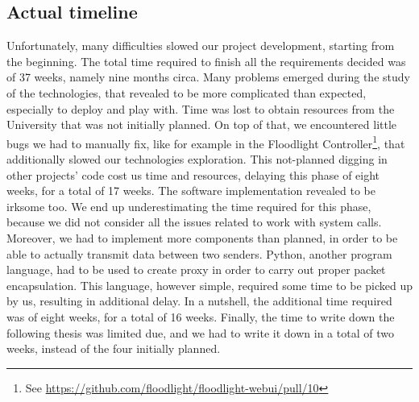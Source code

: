 \subsection{Actual timeline}
Unfortunately, many difficulties slowed our project development, starting from
the beginning. The total time required to finish all the requirements decided
was of 37 weeks, namely nine months circa. Many problems emerged during the
study of the technologies, that revealed to be more complicated than expected,
especially to deploy and play with. Time was lost to obtain resources from the
University that was not initially planned. On top of that, we encountered little
bugs we had to manually fix, like for example in the Floodlight
Controller\footnote{See
  \url{https://github.com/floodlight/floodlight-webui/pull/10}}, that
additionally slowed our technologies exploration. This not-planned digging in
other projects' code cost us time and resources, delaying this phase of eight
weeks, for a total of 17 weeks. The software implementation revealed to be
irksome too. We end up underestimating the time required for this phase, because
we did not consider all the issues related to work with system calls. Moreover,
we had to implement more components than planned, in order to be able to
actually transmit data between two senders. Python, another program language,
had to be used to create proxy in order to carry out proper packet
encapsulation. This language, however simple, required some time to be picked up
by us, resulting in additional delay. In a nutshell, the additional time
required was of eight weeks, for a total of 16 weeks. Finally, the time to write
down the following thesis was limited due, and we had to write it down in a
total of two weeks, instead of the four initially planned.
